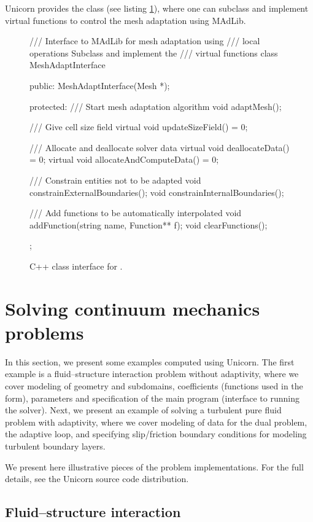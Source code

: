 Unicorn provides the  class (see listing
\ref{code:MeshAdaptInterface}), where one can subclass and implement
virtual functions to control the mesh adaptation using MAdLib.

\begin{figure}
\begin{c++}
/// Interface to MAdLib for mesh adaptation using
/// local operations Subclass and implement the
/// virtual functions
class MeshAdaptInterface
{
public:
  MeshAdaptInterface(Mesh *);

protected:
  /// Start mesh adaptation algorithm
  void adaptMesh();

  /// Give cell size field
  virtual void updateSizeField() = 0;

  /// Allocate and deallocate solver data
  virtual void deallocateData() = 0;
  virtual void allocateAndComputeData() = 0;

  /// Constrain entities not to be adapted
  void constrainExternalBoundaries();
  void constrainInternalBoundaries();

  /// Add functions to be automatically interpolated
  void addFunction(string name, Function** f);
  void clearFunctions();
};
\end{c++}
\caption{C++ class interface for .}
\label{code:MeshAdaptInterface}
\end{figure}

\section{Solving continuum mechanics problems}

In this section, we present some examples computed using Unicorn.  The
first example is a fluid--structure interaction problem without
adaptivity, where we cover modeling of geometry and subdomains,
coefficients (functions used in the form), parameters and
specification of the main program (interface to running the
solver). Next, we present an example of solving a turbulent pure fluid
problem with adaptivity, where we cover modeling of data for the dual
problem, the adaptive loop, and specifying slip/friction boundary
conditions for modeling turbulent boundary layers.

We present here illustrative pieces of the problem
implementations. For the full details, see the Unicorn source code
distribution.

\subsection{Fluid--structure interaction}


